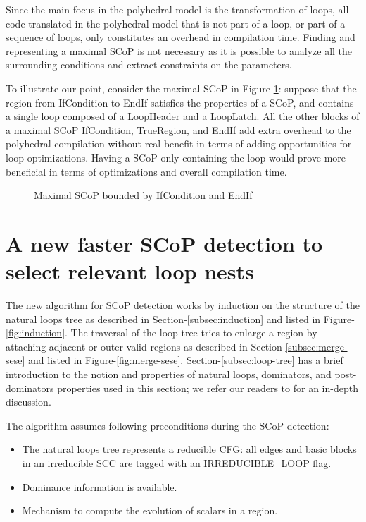 \documentclass{sig-alternate}
\begin{document}
Since the main focus in the polyhedral model is the transformation of loops, all
code translated in the polyhedral model that is not part of a loop, or part of a
sequence of loops, only constitutes an overhead in compilation time.  Finding and
representing a maximal SCoP is not necessary as it is possible to analyze all
the surrounding conditions and extract constraints on the parameters.

To illustrate our point, consider the maximal SCoP in
Figure-\ref{fig:maximality}: suppose that the region from IfCondition to EndIf
satisfies the properties of a SCoP, and contains a single loop composed of a
LoopHeader and a LoopLatch.  All the other blocks of a maximal SCoP
IfCondition, TrueRegion, and EndIf add extra overhead to the polyhedral
compilation without real benefit in terms of adding opportunities for loop
optimizations.  Having a SCoP only containing the loop would prove more
beneficial in terms of optimizations and overall compilation time.

\begin{figure}
\centering
\caption{Maximal SCoP bounded by IfCondition and EndIf}
\label{fig:maximality}
\end{figure}

\section{A new faster SCoP detection to select relevant loop nests}
\label{sec:new-SCoP-detection}
The new algorithm for SCoP detection works by induction on the structure of the
natural loops tree as described in Section-\ref{subsec:induction} and listed in
Figure-\ref{fig:induction}.  The traversal of the loop tree tries to enlarge a
region by attaching adjacent or outer valid regions as described in
Section-\ref{subsec:merge-sese} and listed in Figure-\ref{fig:merge-sese}.
Section-\ref{subsec:loop-tree} has a brief introduction to the notion and
properties of natural loops, dominators, and post-dominators properties used in
this section; we refer our readers to \cite{ramalingam} for an in-depth
discussion.

The algorithm assumes following preconditions during the SCoP detection:
\begin{itemize}
\item The natural loops tree represents a reducible CFG: all edges and basic
  blocks in an irreducible SCC are tagged with an IRREDUCIBLE\_LOOP flag.
\item Dominance information is available.
\item Mechanism to compute the evolution of scalars in a region.
\end{itemize}
\end{document}
